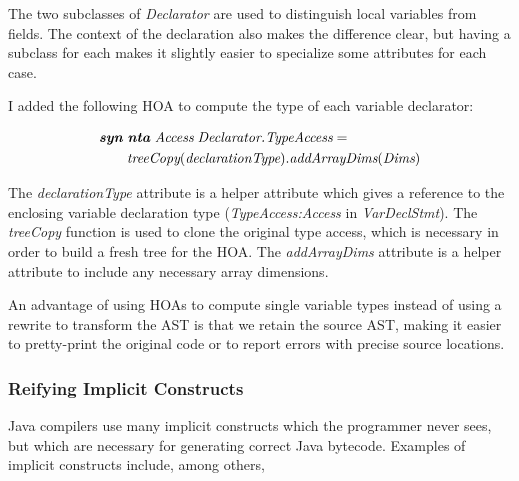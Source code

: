 \documentclass[10pt, twoside, openright]{book}
\begin{document}
\noindent
The two subclasses of \emph{Declarator} are used to distinguish local variables
from fields. The context of the declaration also makes the difference clear, but having a subclass
for each makes it slightly easier to specialize some attributes for each case.

I added the following HOA to compute the type of each variable declarator:


\begin{align*}
& \textbf{\textit{syn}} \; \textbf{\textit{nta}} \; \textit{Access} \; \textit{Declarator.TypeAccess} =\\
& \qquad \textit{treeCopy}(\textit{declarationType}).\textit{addArrayDims}(\textit{Dims})
\end{align*}

\noindent
The \emph{declarationType} attribute is a helper attribute which gives a reference to the enclosing
variable declaration type (\emph{TypeAccess:Access} in \emph{VarDeclStmt}).
The \emph{treeCopy} function is used to clone the original type access, which is necessary
in order to build a fresh tree for the HOA.
The \emph{addArrayDims} attribute is a helper attribute to include any necessary array dimensions.

An advantage of using HOAs to compute single variable types instead of
using a rewrite to transform the AST is that we retain the source AST, making it easier to
pretty-print the original code or to report errors with precise source locations.


\subsubsection{Reifying Implicit Constructs}

Java compilers use many implicit constructs which the programmer never sees, but which are necessary
for generating correct Java bytecode. Examples of implicit constructs include, among others,
\end{document}

